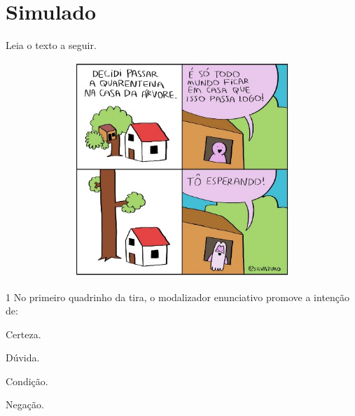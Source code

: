 



\setcounter{chapter}{0}
\chapter[Simulado 1]{Simulado}

Leia o texto a seguir.

\begin{figure}[H]
\centering\includegraphics[width=5in,height=3.2in]{./imgSAEB_6_POR/media/image34.jpeg}
\end{figure}

\num{1} No primeiro quadrinho da tira, o modalizador enunciativo promove a
intenção de:

\begin{escolha}
\item Certeza. 
\item Dúvida. 
\item Condição. 
\item Negação. 
\end{escolha}


